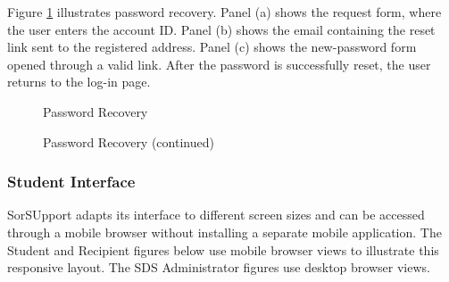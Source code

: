 Figure \ref{fig:reset} illustrates password recovery. Panel (a) shows the request form, where the user enters the account ID. Panel (b) shows the email containing the reset link sent to the registered address. Panel (c) shows the new-password form opened through a valid link. After the password is successfully reset, the user returns to the log-in page.

\renewcommand{\thefigure}{5.4}
\begin{figure}[htbp]
    \centering
    \begin{minipage}[t]{0.43\linewidth}
        \centering
        \vspace{0pt}
        \par{}\par
    \end{minipage}\hspace{0.04\linewidth}
    \begin{minipage}[t]{0.43\linewidth}
        \centering
        \vspace{0pt}
        \par{}\par
    \end{minipage}
    \caption{Password Recovery}
    \label{fig:reset}
\end{figure}
\FloatBarrier

\begin{figure}[htbp]
    \ContinuedFloat
    \centering
    \begin{minipage}[t]{0.43\linewidth}
        \centering
        \vspace{0pt}
        \par{}\par
    \end{minipage}
    \caption[]{Password Recovery (continued)}
\end{figure}
\FloatBarrier

\FloatBarrier
\subsubsection{Student Interface}

SorSUpport adapts its interface to different screen sizes and can be accessed through a mobile browser without installing a separate mobile application. The Student and Recipient figures below use mobile browser views to illustrate this responsive layout. The SDS Administrator figures use desktop browser views.

